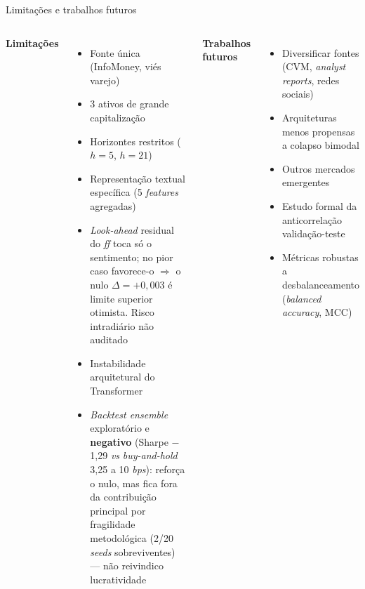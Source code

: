 \documentclass[10pt,aspectratio=169]{beamer}
\begin{document}
\begin{frame}{Limitações e trabalhos futuros}
  \begin{columns}[T]
    \textbf{Limitações}
    \begin{itemize}
      \item Fonte única (InfoMoney, viés varejo)
      \item 3 ativos de grande capitalização
      \item Horizontes restritos ($h=5$, $h=21$)
      \item Representação textual específica (5 \textit{features} agregadas)
      \item \textit{Look-ahead} residual do \textit{ff} toca só o sentimento; no pior caso favorece-o $\Rightarrow$ o nulo $\Delta=+0{,}003$ é limite superior otimista. Risco intradiário não auditado
      \item Instabilidade arquitetural do Transformer
      \item \textit{Backtest ensemble} exploratório e \textbf{negativo} (Sharpe $-$1{,}29 \textit{vs} \textit{buy-and-hold} 3{,}25 a 10 \textit{bps}): reforça o nulo, mas fica fora da contribuição principal por fragilidade metodológica (2/20 \textit{seeds} sobreviventes) --- não reivindico lucratividade
    \end{itemize}
    \textbf{Trabalhos futuros}
    \begin{itemize}
      \item Diversificar fontes (CVM, \textit{analyst reports}, redes sociais)
      \item Arquiteturas menos propensas a colapso bimodal
      \item Outros mercados emergentes
      \item Estudo formal da anticorrelação validação-teste
      \item Métricas robustas a desbalanceamento (\textit{balanced accuracy}, MCC)
    \end{itemize}
  \end{columns}
\end{frame}
\end{document}
